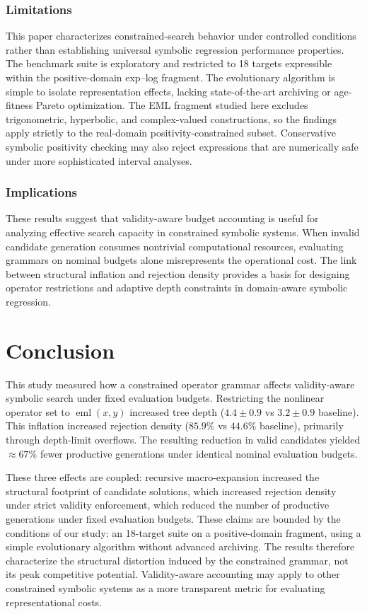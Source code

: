\documentclass[runningheads]{llncs}
\newcommand{\eml}{\operatorname{eml}}
\begin{document}
\subsubsection{Limitations}
This paper characterizes constrained-search behavior under controlled conditions rather than establishing universal symbolic regression performance properties. The benchmark suite is exploratory and restricted to 18 targets expressible within the positive-domain exp--log fragment. The evolutionary algorithm is simple to isolate representation effects, lacking state-of-the-art archiving or age-fitness Pareto optimization. The EML fragment studied here excludes trigonometric, hyperbolic, and complex-valued constructions, so the findings apply strictly to the real-domain positivity-constrained subset. Conservative symbolic positivity checking may also reject expressions that are numerically safe under more sophisticated interval analyses.

\subsubsection{Implications}
These results suggest that validity-aware budget accounting is useful for analyzing effective search capacity in constrained symbolic systems. When invalid candidate generation consumes nontrivial computational resources, evaluating grammars on nominal budgets alone misrepresents the operational cost. The link between structural inflation and rejection density provides a basis for designing operator restrictions and adaptive depth constraints in domain-aware symbolic regression.

\section{Conclusion}\label{sec:conclusion}

This study measured how a constrained operator grammar affects validity-aware symbolic search under fixed evaluation budgets. Restricting the nonlinear operator set to $\eml(x,y)$ increased tree depth ($4.4\pm0.9$ vs $3.2\pm0.9$ baseline). This inflation increased rejection density ($85.9\%$ vs $44.6\%$ baseline), primarily through depth-limit overflows. The resulting reduction in valid candidates yielded $\approx 67\%$ fewer productive generations under identical nominal evaluation budgets.

These three effects are coupled: recursive macro-expansion increased the structural footprint of candidate solutions, which increased rejection density under strict validity enforcement, which reduced the number of productive generations under fixed evaluation budgets. These claims are bounded by the conditions of our study: an 18-target suite on a positive-domain fragment, using a simple evolutionary algorithm without advanced archiving. The results therefore characterize the structural distortion induced by the constrained grammar, not its peak competitive potential. Validity-aware accounting may apply to other constrained symbolic systems as a more transparent metric for evaluating representational costs.
\end{document}
